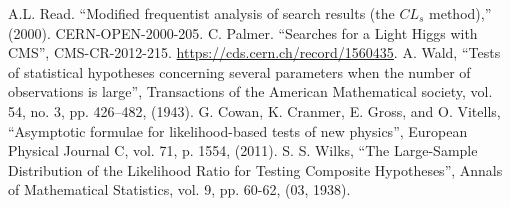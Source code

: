 \documentclass[print]{nuthesis}
\begin{document}
\begin{thebibliography}{300}
 A.L. Read. ``Modified frequentist analysis of search results (the $CL_s$ method),'' (2000). CERN-OPEN-2000-205.
 C. Palmer. ``Searches for a Light Higgs with CMS'', CMS-CR-2012-215. \url{https://cds.cern.ch/record/1560435}.
A. Wald, ``Tests of statistical hypotheses concerning several parameters when the number of observations is large'', Transactions of the American Mathematical society, vol. 54, no. 3, pp. 426–482, (1943).
 G. Cowan, K. Cranmer, E. Gross, and O. Vitells, ``Asymptotic formulae for likelihood-based tests of new physics'', European Physical Journal C, vol. 71, p. 1554, (2011).
 S. S. Wilks, ``The Large-Sample Distribution of the Likelihood Ratio for Testing Composite Hypotheses'', Annals of Mathematical Statistics, vol. 9, pp. 60-62, (03, 1938).


\end{thebibliography}
\end{document}
